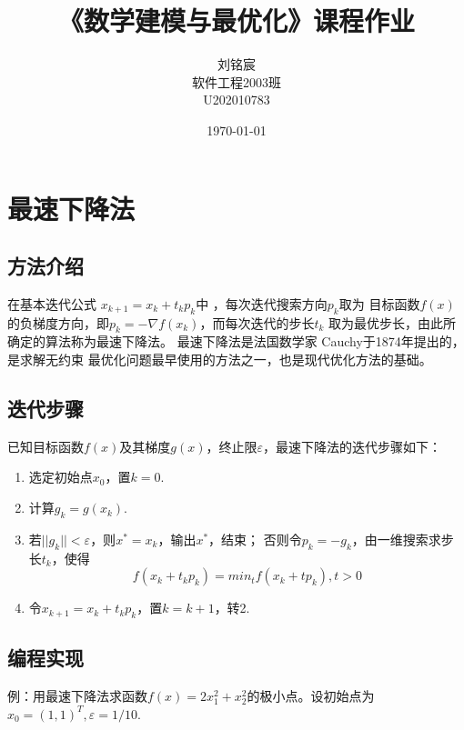 \documentclass[12pt,a4paper]{article}
\title{《数学建模与最优化》课程作业}
\author{刘铭宸\\软件工程2003班\\U202010783}
\date{\today}
\begin{document}
\begin{titlepage}
\maketitle
\end{titlepage}

\tableofcontents

\newpage
\section{最速下降法}
\subsection{方法介绍}
在基本迭代公式
$x_{k+1}=x_k+t_kp_k$中 ，每次迭代搜索方向$p_k$取为
目标函数$f(x)$ 的负梯度方向，即$p_k=-\nabla f(x_k)$，而每次迭代的步长$t_k$
取为最优步长，由此所确定的算法称为最速下降法。
最速下降法是法国数学家
Cauchy于1874年提出的，是求解无约束
最优化问题最早使用的方法之一，也是现代优化方法的基础。
\subsection{迭代步骤}
已知目标函数$f(x)$及其梯度$g(x)$，终止限$\varepsilon$，最速下降法的迭代步骤如下：
\begin{enumerate}
    \item 选定初始点$x_0$，置$k=0$.
    \item 计算$g_k=g(x_k)$.
    \item 若$||g_k||<\varepsilon$，则$x^*=x_k$，输出$x^*$，结束；
    否则令$p_k=-g_k$，由一维搜索求步长$t_k$，使得
    \begin{equation}
        f(x_k+t_kp_k)=min_tf(x_k+tp_k),t>0
    \end{equation}
    \item 令$x_{k+1}=x_k+t_kp_k$，置$k=k+1$，转2.
\end{enumerate}

\subsection{编程实现}
例：用最速下降法求函数$f(x)=2x_1^2+x_2^2$的极小点。设初始点为$x_0=(1,1)^T,\varepsilon = 1/10$.
\end{document}
